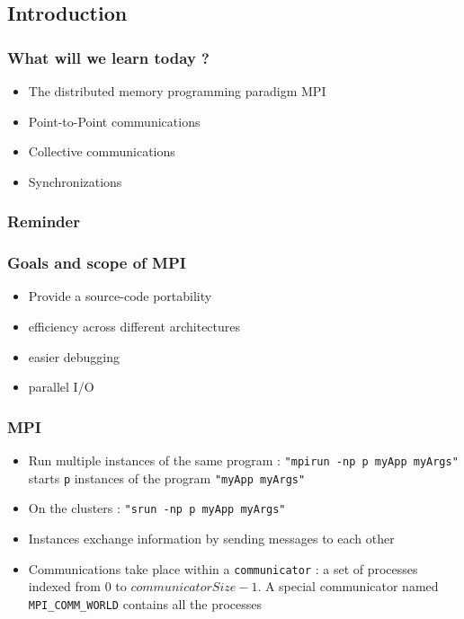 \subsection{Introduction}

\begin{frame}
	\frametitle{What will we learn today ?}	
	\begin{itemize}
	\item {The distributed memory programming paradigm MPI}
	\item {Point-to-Point communications}
	\item {Collective communications}
	\item {Synchronizations}
	\end{itemize}
\end{frame}


\begin{frame}
	\frametitle{Reminder}
\begin{center}

\end{center}
\end{frame}

\begin{frame}
\frametitle{Goals and scope of MPI}	
	\begin{itemize}
	\item {Provide a source-code portability}
	\item {efficiency across different architectures}
	\item {easier debugging}
	\item {parallel I/O}
	\end{itemize}
\end{frame}

\begin{frame}[containsverbatim]
\frametitle{MPI}
	\begin{itemize}
	\item {Run multiple instances of the same program : \verb+"mpirun -np p myApp myArgs"+ starts \verb+p+ instances of the program \verb+"myApp myArgs"+}
	\item {On the clusters : \verb+"srun -np p myApp myArgs"+}
	\item {Instances exchange information by sending messages to each other}
	\item {Communications take place within a \verb+communicator+ : a set of processes indexed from $0$ to $communicatorSize-1$. A special communicator named \verb+MPI_COMM_WORLD+ contains all the processes}
	\end{itemize}
\end{frame}


